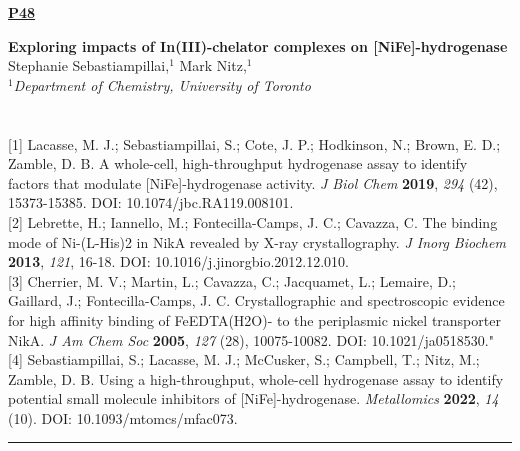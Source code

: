 \documentclass[titlepage,oneside,openany,10pt]{book}
\newenvironment{posterabswref}[5] %
        {
        \newcommand{\posterref}{#5}
	\begin{flushright}
                \underline{\textbf{#4}}
        \end{flushright}
        \textbf{#1}\\%
        #2\\%
        \textit{#3}\\\\%
        }
        {
        \vspace{0.5cm}
        \\\noindent \posterref \\ \noindent\rule{15cm}{0.5pt}%
        }
\begin{document}
\newpage

\begin{posterabswref}
    {Exploring impacts of In(III)-chelator complexes on {[}NiFe{]}-hydrogenase}
    {Stephanie Sebastiampillai,$^{1}$ Mark Nitz,$^{1}$}
    {
    $^1$Department of Chemistry, University of Toronto
    }
    {P48}
    {
    {[1]} Lacasse, M. J.; Sebastiampillai, S.; Cote, J. P.; Hodkinson, N.; Brown, E. D.; Zamble, D. B. A whole-cell, high-throughput hydrogenase assay to identify factors that modulate {[}NiFe{]}-hydrogenase activity. \emph{J Biol Chem}  \textbf{2019}, \emph{294} (42), 15373-15385. DOI: 10.1074/jbc.RA119.008101.\\
    {[2]} Lebrette, H.; Iannello, M.; Fontecilla-Camps, J. C.; Cavazza, C. The binding mode of Ni-(L-His)2 in NikA revealed by X-ray crystallography. \emph{J Inorg Biochem}  \textbf{2013}, \emph{121}, 16-18. DOI: 10.1016/j.jinorgbio.2012.12.010.\\
    {[3]} Cherrier, M. V.; Martin, L.; Cavazza, C.; Jacquamet, L.; Lemaire, D.; Gaillard, J.; Fontecilla-Camps, J. C. Crystallographic and spectroscopic evidence for high affinity binding of FeEDTA(H2O)- to the periplasmic nickel transporter NikA. \emph{J Am Chem Soc}  \textbf{2005}, \emph{127} (28), 10075-10082. DOI: 10.1021/ja0518530."\\
    {[4]} Sebastiampillai, S.; Lacasse, M. J.; McCusker, S.; Campbell, T.; Nitz, M.; Zamble, D. B. Using a high-throughput, whole-cell hydrogenase assay to identify potential small molecule inhibitors of {[}NiFe{]}-hydrogenase. \emph{Metallomics}  \textbf{2022}, \emph{14} (10). DOI: 10.1093/mtomcs/mfac073.
    }

\end{posterabswref}
\end{document}
